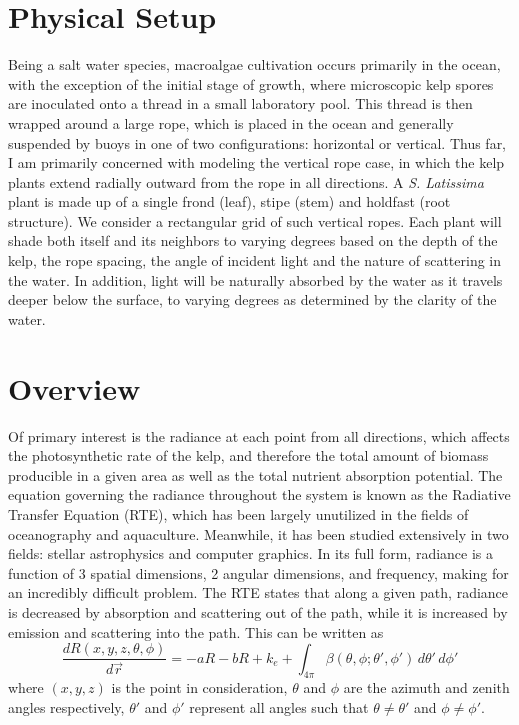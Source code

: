 \documentclass[10pt]{article}
\begin{document}
\begin{multicols}{2}
\section{Physical Setup}
Being a salt water species, macroalgae cultivation occurs primarily in the ocean, with the exception of the initial stage of growth, where microscopic kelp spores are inoculated onto a thread in a small laboratory pool.
This thread is then wrapped around a large rope, which is placed in the ocean and generally suspended by buoys in one of two configurations: horizontal or vertical.
Thus far, I am primarily concerned with modeling the vertical rope case, in which the kelp plants extend radially outward from the rope in all directions.
A \textit{S. Latissima} plant is made up of a single frond (leaf), stipe (stem) and holdfast (root structure).
We consider a rectangular grid of such vertical ropes. 
Each plant will shade both itself and its neighbors to varying degrees based on the depth of the kelp, the rope spacing, the angle of incident light and the nature of scattering in the water.
In addition, light will be naturally absorbed by the water as it travels deeper below the surface, to varying degrees as determined by the clarity of the water.

\section{Overview}
Of primary interest is the radiance at each point from all directions, which affects the photosynthetic rate of the kelp, and therefore the total amount of biomass producible in a given area as well as the total nutrient absorption potential.
The equation governing the radiance throughout the system is known as the Radiative Transfer Equation (RTE), which has been largely unutilized in the fields of oceanography and aquaculture.
Meanwhile, it has been studied extensively in two fields: stellar astrophysics and computer graphics.
In its full form, radiance is a function of 3 spatial dimensions, 2 angular dimensions, and frequency, making for an incredibly difficult problem.
The RTE states that along a given path, radiance is decreased by absorption and scattering out of the path, while it is increased by emission and scattering into the path.
This can be written as
\begin{equation}
	\label{eqn:rte}
	\frac{dR(x,y,z,\theta,\phi)}{d\vec{r}} = -aR -bR + k_e + \int_{4\pi} \beta(\theta,\phi;\theta',\phi') \,d\theta'\,d\phi'
\end{equation}
where $(x,y,z)$ is the point in consideration, $\theta$ and $\phi$ are the azimuth and zenith angles respectively, $\theta'$ and $\phi'$ represent all angles such that $\theta \neq \theta'$ and $\phi \neq \phi'$.


\end{multicols}
\end{document}
